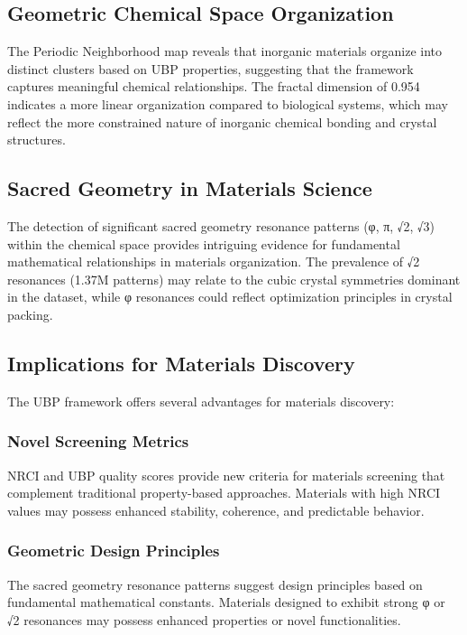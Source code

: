\documentclass[12pt,a4paper]{article}
\begin{document}
\subsection{Geometric Chemical Space Organization}

The Periodic Neighborhood map reveals that inorganic materials organize into distinct clusters based on UBP properties, suggesting that the framework captures meaningful chemical relationships. The fractal dimension of 0.954 indicates a more linear organization compared to biological systems, which may reflect the more constrained nature of inorganic chemical bonding and crystal structures.

\subsection{Sacred Geometry in Materials Science}

The detection of significant sacred geometry resonance patterns (φ, π, √2, √3) within the chemical space provides intriguing evidence for fundamental mathematical relationships in materials organization. The prevalence of √2 resonances (1.37M patterns) may relate to the cubic crystal symmetries dominant in the dataset, while φ resonances could reflect optimization principles in crystal packing.

\subsection{Implications for Materials Discovery}

The UBP framework offers several advantages for materials discovery:

\subsubsection{Novel Screening Metrics}
NRCI and UBP quality scores provide new criteria for materials screening that complement traditional property-based approaches. Materials with high NRCI values may possess enhanced stability, coherence, and predictable behavior.

\subsubsection{Geometric Design Principles}
The sacred geometry resonance patterns suggest design principles based on fundamental mathematical constants. Materials designed to exhibit strong φ or √2 resonances may possess enhanced properties or novel functionalities.
\end{document}
